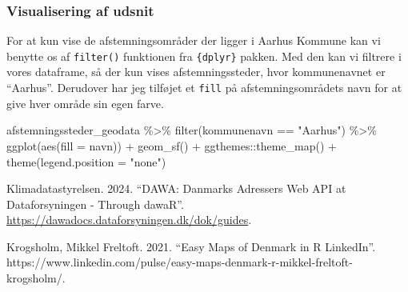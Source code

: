 \documentclass[
  a4paper,
  DIV=11,
  numbers=noendperiod,
  oneside]{scrartcl}
\newenvironment{Shaded}{\begin{snugshade}}{\end{snugshade}}
\newcommand{\AttributeTok}[1]{\textcolor[rgb]{0.40,0.45,0.13}{#1}}
\newcommand{\FunctionTok}[1]{\textcolor[rgb]{0.28,0.35,0.67}{#1}}
\newcommand{\NormalTok}[1]{\textcolor[rgb]{0.00,0.23,0.31}{#1}}
\newcommand{\SpecialCharTok}[1]{\textcolor[rgb]{0.37,0.37,0.37}{#1}}
\newcommand{\StringTok}[1]{\textcolor[rgb]{0.13,0.47,0.30}{#1}}
\newlength{\cslhangindent}
\newenvironment{CSLReferences}[2] %
 {\begin{list}{}{%
  \setlength{\itemindent}{0pt}
  \setlength{\leftmargin}{0pt}
  \setlength{\parsep}{0pt}
  \ifodd #1
   \setlength{\leftmargin}{\cslhangindent}
   \setlength{\itemindent}{-1\cslhangindent}
  \fi
  \setlength{\itemsep}{#2\baselineskip}}}
 {\end{list}}
\begin{document}
\subsubsection{Visualisering af udsnit}\label{visualisering-af-udsnit}

For at kun vise de afstemningsområder der ligger i Aarhus Kommune kan vi
benytte os af \texttt{filter()} funktionen fra \texttt{\{dplyr\}}
pakken. Med den kan vi filtrere i vores dataframe, så der kun vises
afstemningssteder, hvor kommunenavnet er ``Aarhus''. Derudover har jeg
tilføjet et \texttt{fill} på afstemningsområdets navn for at give hver
område sin egen farve.

\begin{Shaded}
\begin{Highlighting}[]
\NormalTok{afstemningssteder\_geodata }\SpecialCharTok{\%\textgreater{}\%}
  \FunctionTok{filter}\NormalTok{(kommunenavn }\SpecialCharTok{==} \StringTok{"Aarhus"}\NormalTok{) }\SpecialCharTok{\%\textgreater{}\%}
  \FunctionTok{ggplot}\NormalTok{(}\FunctionTok{aes}\NormalTok{(}\AttributeTok{fill =}\NormalTok{ navn)) }\SpecialCharTok{+}
  \FunctionTok{geom\_sf}\NormalTok{() }\SpecialCharTok{+}
\NormalTok{  ggthemes}\SpecialCharTok{::}\FunctionTok{theme\_map}\NormalTok{() }\SpecialCharTok{+}
  \FunctionTok{theme}\NormalTok{(}\AttributeTok{legend.position =} \StringTok{"none"}\NormalTok{)}
\end{Highlighting}
\end{Shaded}

{
\makeatletter
\def\LT@makecaption#1#2#3{%
  \noalign{\smash{\hbox{\kern\textwidth\rlap{\kern\marginparsep
  \parbox[t]{\marginparwidth}{%
    \footnotesize{%
      \vspace{(1.1\baselineskip)}
    #1{#2: }\ignorespaces #3}}}}}}%
    }
\makeatother

\begin{figure}[tbh]



\end{figure}%

}

\label{refs}
\begin{CSLReferences}{1}{0}
Klimadatastyrelsen. 2024. {``{DAWA}: {Danmarks Adressers Web API} at
{Dataforsyningen} - Through {dawaR}''}.
\url{https://dawadocs.dataforsyningen.dk/dok/guides}.

Krogsholm, Mikkel Freltoft. 2021. {``Easy Maps of {Denmark} in {R}
{\textbar} {LinkedIn}''}.
https://www.linkedin.com/pulse/easy-maps-denmark-r-mikkel-freltoft-krogsholm/.

\end{CSLReferences}
\end{document}
